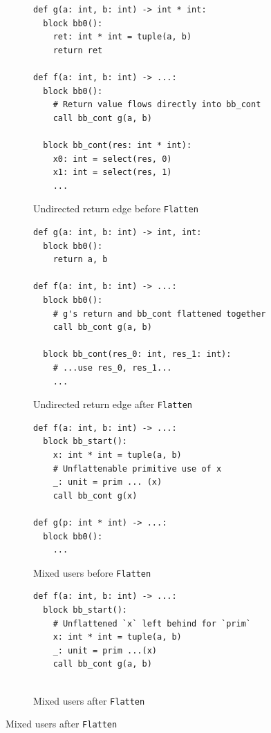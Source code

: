 \begin{figure}[htbp]
  \centering
  \begin{subfigure}[t]{0.48\textwidth}
    \caption{Undirected return edge before \texttt{Flatten}}
    \label{fig:true_flat_undirected_before}
\begin{verbatim}
def g(a: int, b: int) -> int * int:
  block bb0():
    ret: int * int = tuple(a, b)
    return ret

def f(a: int, b: int) -> ...:
  block bb0():
    # Return value flows directly into bb_cont
    call bb_cont g(a, b)

  block bb_cont(res: int * int):
    x0: int = select(res, 0)
    x1: int = select(res, 1)
    ...
\end{verbatim}
  \end{subfigure}\hfill
  \begin{subfigure}[t]{0.48\textwidth}
    \caption{Undirected return edge after \texttt{Flatten}}
    \label{fig:true_flat_undirected_after}
\begin{verbatim}
def g(a: int, b: int) -> int, int:
  block bb0():
    return a, b

def f(a: int, b: int) -> ...:
  block bb0():
    # g's return and bb_cont flattened together
    call bb_cont g(a, b)

  block bb_cont(res_0: int, res_1: int):
    # ...use res_0, res_1...
    ...
\end{verbatim}
  \end{subfigure}

  \vspace{1mm}

  \begin{subfigure}[t]{0.48\textwidth}
    \caption{Mixed users before \texttt{Flatten}}
    \label{fig:true_flat_mixed_before}
\begin{verbatim}
def f(a: int, b: int) -> ...:
  block bb_start():
    x: int * int = tuple(a, b)
    # Unflattenable primitive use of x
    _: unit = prim ... (x)
    call bb_cont g(x)

def g(p: int * int) -> ...:
  block bb0():
    ...
\end{verbatim}
  \end{subfigure}\hfill
  \begin{subfigure}[t]{0.48\textwidth}
    \caption{Mixed users after \texttt{Flatten}}
    \label{fig:true_flat_mixed_after}
\begin{verbatim}
def f(a: int, b: int) -> ...:
  block bb_start():
    # Unflattened `x` left behind for `prim`
    x: int * int = tuple(a, b)
    _: unit = prim ...(x)
    call bb_cont g(a, b)


\end{verbatim}
\end{subfigure}
\end{figure}
